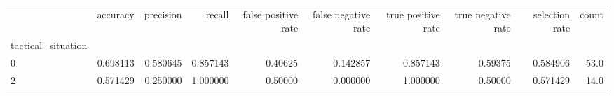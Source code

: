 \begin{tabular}{lrrrrrrrrr}
\toprule
{} &  accuracy &  precision &    recall &  false positive rate &  false negative rate &  true positive rate &  true negative rate &  selection rate &  count \\
tactical\_situation &           &            &           &                      &                      &                     &                     &                 &        \\
\midrule
0                  &  0.698113 &   0.580645 &  0.857143 &              0.40625 &             0.142857 &            0.857143 &             0.59375 &        0.584906 &   53.0 \\
2                  &  0.571429 &   0.250000 &  1.000000 &              0.50000 &             0.000000 &            1.000000 &             0.50000 &        0.571429 &   14.0 \\
\bottomrule
\end{tabular}
